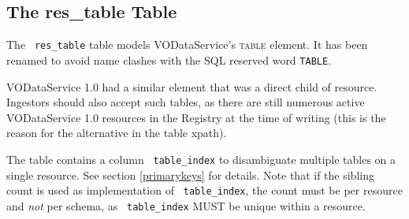 \documentclass[11pt,a4paper]{ivoa}
\newcommand{\rtent}[1]{\texttt{\color{rtcolor} #1}}
\newcommand{\vorent}[1]{\textsc{#1}}
\begin{document}


\subsection{The res\_table Table}

\label{table_res_table}

The \rtent{res\_table} table models VODataService's
\vorent{table} element.  It has been renamed to avoid name clashes
with the SQL reserved word \texttt{TABLE}.

VODataService 1.0 had a similar element that was a direct child of
resource.  Ingestors should also accept such tables, as there are still
numerous active VODataService 1.0 resources in the Registry at the time
of writing (this is the reason for the alternative in the table xpath).

The table contains a column \rtent{table\_index} to disambiguate
multiple tables on a single resource.  See section \ref{primarykeys} for details.  Note that if the sibling
count is used as implementation of \rtent{table\_index}, the count
must be per resource and \emph{not} per schema, as
\rtent{table\_index} MUST be unique within a resource.


\end{document}
